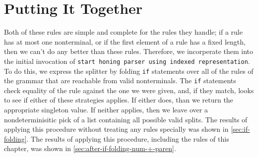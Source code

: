   \section{Putting It Together}
     Both of these rules are simple and complete for the rules they handle; if a rule has at most one nonterminal, or if the first element of a rule has a fixed length, then we can't do any better than these rules.  Therefore, we incorperate them into the initial invocation of \verb|start honing parser using indexed representation|.  To do this, we express the splitter by folding \verb|if| statements over all of the rules of the grammar that are reachable from valid nonterminals.  The \verb|if| statements check equality of the rule against the one we were given, and, if they match, looks to see if either of these strategies applies.  If either does, than we return the appropriate singleton value.  If neither applies, then we leave over a nondeterminisitic pick of a list containing all possible valid splits.  The results of applying this procedure without treating any rules specially was shown in \autoref{sec:if-folding}.  The results of applying this procedure, including the rules of this chapter, was shown in \autoref{sec:after-if-folding-num-+-paren}.
     
